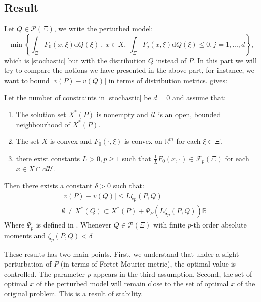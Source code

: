 \documentclass{amsart}
\newcommand{\RR}{\mathbb{R}}
\begin{document}
\subsection{Result}
Let $Q\in\mathcal{P}\left(\Xi\right)$, we write the perturbed model:
\begin{equation*}
    \min\left\{\int_\Xi F_0\left(x,\xi\right)\text{d}Q\left(\xi\right)\:,\: x\in X, \: \int_\Xi F_j\left(x,\xi\right)\text{d}Q\left(\xi\right)\leq0, j=1,...,d\right\},
\end{equation*}
which is \eqref{stochastic} but with the distribution $Q$ instead of $P$. In this part we will try to compare the notions we have presented in the above part, for instance, we want to bound $\lvert v\left(P\right)-v\left(Q\right)\rvert$ in terms of distribution metrics. \cite[Corollary 14]{romisch_stability_2003} gives:
\begin{theorem}\label{stability_th}
    Let the number of constraints in \eqref{stochastic} be $d=0$ and assume that:
    \begin{enumerate}
        \item The  solution set $X^*\left(P\right)$ is nonempty and $\mathcal{U}$ is an open, bounded neighbourhood of $X^*\left(P\right)$.
        \item The set $X$ is convex and $F_0\left(\cdot,\xi\right)$ is convex on $\RR^m$ for each $\xi\in\Xi$.
        \item there exist constants $L>0, p\geq1$ such that $\frac{1}{L}F_0\left(x,\cdot \right)\in\mathcal{F}_p\left(\Xi\right)$ for each $x\in X\cap cl\mathcal{U}$. 
    \end{enumerate}
    Then there exists a constant $\delta>0$ such that:
    \begin{align*}
        &\lvert v\left(P\right)-v\left(Q\right)\rvert \leq L\zeta_p\left(P,Q\right) \\
        & \emptyset \ne X^*\left(Q\right)\subset X^*\left(P\right)+\Psi_P\left(L\zeta_p\left(P,Q\right)\right)\mathbb{B}
    \end{align*}
    Where $\Psi_p$ is defined in \cite[2.22-2.23]{romisch_stability_2003}. Whenever $Q\in\mathcal{P}\left(\Xi\right)$ with finite $p$-th order absolute moments and $\zeta_p\left(P,Q\right)<\delta$
\end{theorem}
These results has two main points. First, we understand that under a slight perturbation of $P$ (in terms of Fortet-Mourier metric), the optimal value is controlled. The parameter $p$ appears in the third assumption. Second, the set of optimal $x$ of the perturbed model will remain close to the set of optimal $x$ of the original problem. This is a result of stability. 
\end{document}
